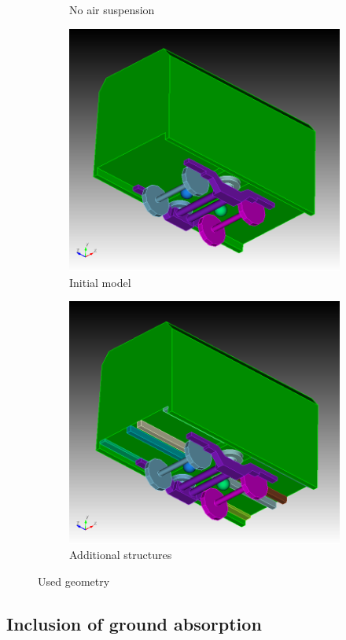\begin{figure}[H]
\begin{subfigure}[b]{0.49\textwidth}
		\caption{No air suspension}
	\end{subfigure}
	\begin{subfigure}[b]{0.49\textwidth}
		\centering
		\includegraphics[width = 0.8\linewidth]{fig/chap4/geometry/initial_model_2.png}
		\caption{Initial model}
	\end{subfigure}
	\begin{subfigure}[b]{0.49\textwidth}
		\centering
		\includegraphics[width = 0.8\linewidth]{fig/chap4/geometry/additional_structures.png}
		\caption{Additional structures}
	\end{subfigure}

	\caption{Used geometry}
\end{figure}

\subsection{Inclusion of ground absorption}

